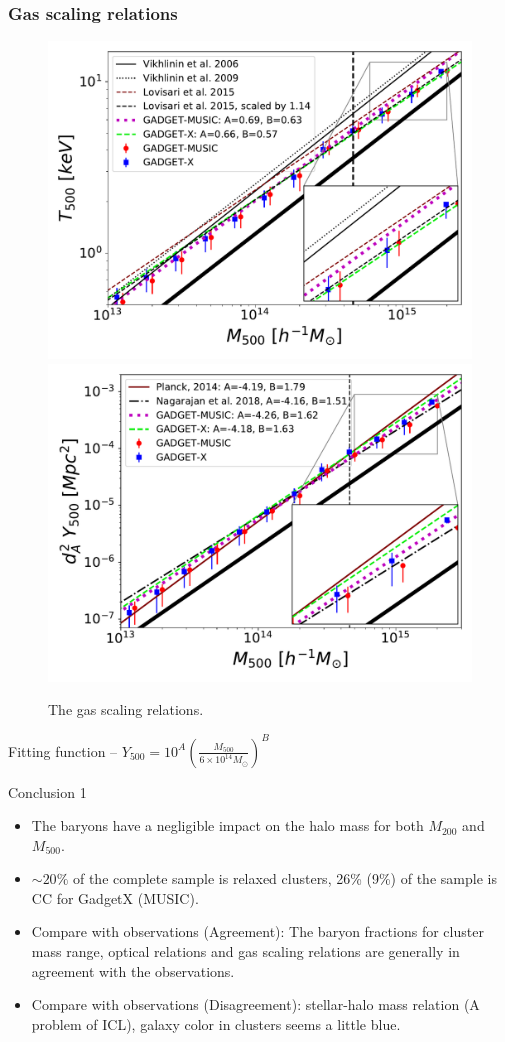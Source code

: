 \documentclass[aspectratio=43]{beamer}
\begin{document}
\begin{frame}
  \frametitle{Gas scaling relations}
  \begin{figure}
    \includegraphics[width=0.48\linewidth]{T-M-relations}
    \includegraphics[width=0.48\linewidth]{YM_relation-full.pdf}
    \vspace{-0.4cm}
    \caption{The gas scaling relations.}
  \end{figure}

\begin{center}
  Fitting function -- $Y_{500} = 10^A (\frac{M_{500}}{6\times10^{14} M_{\odot}})^B$
\end{center}
\end{frame}

\begin{frame}{Conclusion 1}
  \begin{itemize}
    \item The baryons have a negligible impact on the halo mass for both $M_{200}$ and $M_{500}$.
    \item $\sim 20 \%$ of the complete sample is relaxed clusters, 26\% (9\%) of the sample is CC for GadgetX (MUSIC).
    \item Compare with observations (Agreement): The baryon fractions for cluster mass range, optical relations and gas scaling relations are generally in agreement with the observations.
    \item Compare with observations (Disagreement):  stellar-halo mass relation (A problem of ICL), galaxy color in clusters seems a little blue.
  \end{itemize}
  \begin{center}
    \hyperlink{lastpage}{}    
  \end{center}
\end{frame}
\end{document}

